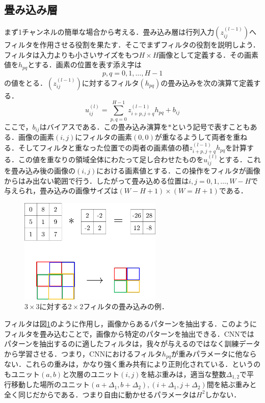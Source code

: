 \documentclass[a4paper,11pt]{jsreport}
\begin{document}
\subsection{畳み込み層}
まず1チャンネルの簡単な場合から考える．畳み込み層は行列入力$(z_{ij}^{(l-1)})$へフィルタを作用させる役割を果たす．そこでまずフィルタの役割を説明しよう．フィルタは入力よりも小さいサイズをもつ$H \times H$画像として定義する．その画素値を$h_{pq}$とする．画素の位置を表す添え字は
\begin{equation}
  p,q = 0,1,\dots,H-1
\end{equation}
の値をとる．$(z_{ij}^{(l-1)})$に対するフィルタ$(h_{pq})$の畳み込みを次の演算て定義する．
\begin{equation}
  u_{ij}^{(l)}
  = \sum_{p,q=0}^{H-1} z_{i+p,j+q}^{(l-1)} h_{pq} + b_{ij}
\end{equation}
ここで，$b_{ij}$はバイアスである．この畳み込み演算を$\ast$という記号で表すこともある．画像の画素$(i,j)$にフィルタの画素$(0,0)$が重なるようして両者を重ねる．そしてフィルタと重なった位置での両者の画素値の積$z_{i+p,j+q}^{(l-1)} h_{pq}$を計算する．この値を重なりの領域全体にわたって足し合わせたものを$u_{ij}^{(l)}$とする．これを畳み込み後の画像の$(i,j)$における画素値とする．この操作をフィルタが画像からはみ出ない範囲で行う．したがって畳み込める位置は$i,j=0,1,\dots,W-H$で与えられ，畳み込みの画像サイズは$(W-H+1)\times(W=H+1)$である．\par
\begin{figure}[H]
   \begin{center}
       \includegraphics[height=5cm]{image/畳み込み演算の例.png}
       \caption{$3 \times 3$に対する$2 \times 2$フィルタの畳み込みの例．}
       \label{畳み込み演算の例}
   \end{center}
\end{figure}
フィルタは図\ref{畳み込み演算の例}のように作用し，画像からあるパターンを抽出する．このようにフィルタを畳み込むことで，画像から特定のパターンを抽出できる．CNNではパターンを抽出するのに適したフィルタは，我々が与えるのではなく訓練データから学習させる．つまり，CNNにおけるフィルタ$h_{pq}$が重みパラメータに他ならない．これらの重みは，かなり強く重み共有により正則化されている．というのもユニット$(a,b)$と次層のユニット$(i,j)$を結ぶ重みは，適当な整数$\Delta_{1,2}$で平行移動した場所のユニット$(a+\Delta_1,b+\Delta_2),(i+\Delta_1,j+\Delta_2)$間を結ぶ重みと全く同じだからである．つまり自由に動かせるパラメータは$H^2$しかない．\par
\end{document}
